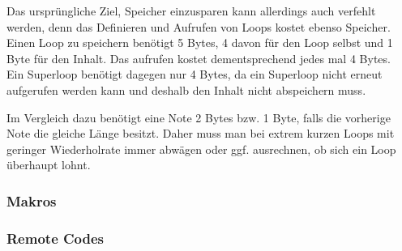 Das ursprüngliche Ziel, Speicher einzusparen kann allerdings auch verfehlt werden, denn das Definieren und Aufrufen von Loops kostet ebenso Speicher. \\
Einen Loop zu speichern benötigt 5 Bytes, 4 davon für den Loop selbst und 1 Byte für den Inhalt. Das aufrufen kostet dementsprechend jedes mal 4 Bytes.\\
Ein Superloop benötigt dagegen nur 4 Bytes, da ein Superloop nicht erneut aufgerufen werden kann und deshalb den Inhalt nicht abspeichern muss.

Im Vergleich dazu benötigt eine Note 2 Bytes bzw. 1 Byte, falls die vorherige Note die gleiche Länge besitzt. Daher muss man bei extrem kurzen Loops mit geringer Wiederholrate immer abwägen oder ggf. ausrechnen, ob sich ein Loop überhaupt lohnt.

\subsubsection{Makros}



\subsubsection{Remote Codes}